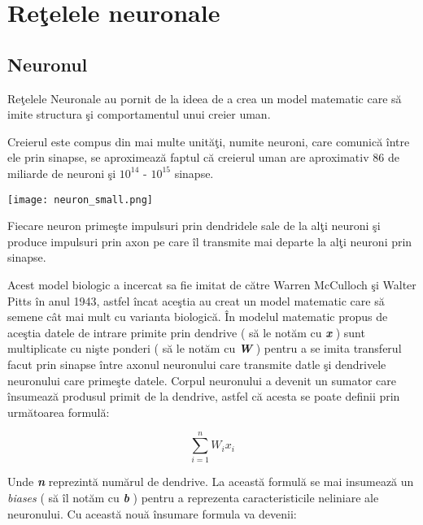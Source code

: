 \chapter{Re\c{t}elele neuronale}

\section{Neuronul}

Re\c{t}elele Neuronale au pornit de la ideea de a crea un model matematic care s\u{a} imite structura \c{s}i comportamentul unui creier uman.
\par
Creierul este compus din mai multe unit\u{a}\c{t}i, numite neuroni, care comunic\u{a} \^{i}ntre ele prin sinapse, se aproximeaz\u{a} faptul c\u{a} creierul uman are aproximativ 86 de miliarde de neuroni \c{s}i $10^{14}$ - $10^{15}$  sinapse.

\begin{center}
\texttt{[image: neuron\_small.png]}
\end{center}

Fiecare neuron prime\c{s}te impulsuri prin dendridele sale de la al\c{t}i neuroni \c{s}i produce impulsuri prin axon pe care \^{i}l transmite mai departe la al\c{t}i neuroni prin sinapse.

\par

Acest model biologic a incercat sa fie imitat de c\u{a}tre Warren McCulloch \c{s}i Walter Pitts \^{i}n anul 1943, astfel \^{i}ncat ace\c{s}tia au creat un model matematic care s\u{a} semene c\^{a}t mai mult cu varianta biologic\u{a}. \^{I}n modelul matematic propus de ace\c{s}tia datele de intrare primite prin dendrive ( s\u{a} le not\u{a}m cu \textbf{\textit{x}} ) sunt multiplicate cu ni\c{s}te ponderi ( s\u{a} le not\u{a}m cu \textbf{\textit{W}} ) pentru a se imita transferul facut prin sinapse \^{i}ntre axonul neuronului care transmite datle \c{s}i dendrivele neuronului care prime\c{s}te datele. Corpul neuronului a devenit un sumator care \^{i}nsumeaz\u{a} produsul primit de la dendrive, astfel c\u{a} acesta se poate definii prin urm\u{a}toarea formul\u{a}:

$$ \sum_{i=1}^{n} W_i x_i $$ 

Unde \textbf{\textit{n}} reprezint\u{a} num\u{a}rul de dendrive. La aceast\u{a} formul\u{a} se mai insumeaz\u{a} un \textit{biases} ( s\u{a} \^{i}l not\u{a}m cu \textbf{\textit{b}} ) pentru a reprezenta caracteristicile neliniare ale neuronului. Cu aceast\u{a} nou\u{a} \^{i}nsumare formula va devenii:

